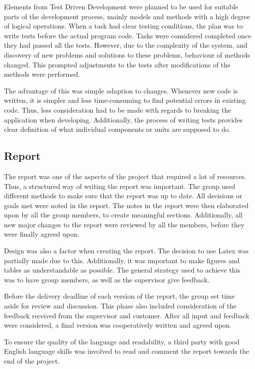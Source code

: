 Elements from Test Driven Development were planned to be used for suitable parts of the development process, mainly models and methods with a high degree of logical operations. When a task had clear testing conditions, the plan was to write tests before the actual program code. Tasks were considered completed once they had passed all the tests. However, due to the complexity of the system, and discovery of new problems and solutions to these problems, behaviour of methods changed. This prompted adjustments to the tests after modifications of the methods were performed.

The advantage of this was simple adaption to changes. Whenever new code is written, it is simpler and less time-consuming to find potential errors in existing code. Thus, less consideration had to be made with regards to breaking the application when developing. Additionally, the process of writing tests provides clear definition of what individual components or units are supposed to do.

\subsection{Report}
\label{subsec:process_and_methodology-process_methodology-report}

The report was one of the aspects of the project that required a lot of resources. Thus, a structured way of writing the report was important. The group used different methods to make sure that the report was up to date. All decisions or goals met were noted in the report. The notes in the report were then elaborated upon by all the group members, to create meaningful sections. Additionally, all new major changes to the report were reviewed by all the members, before they were finally agreed upon.

Design was also a factor when creating the report. The decision to use Latex was partially made due to this. Additionally, it was important to make figures and tables as understandable as possible. The general strategy used to achieve this was to have group members, as well as the supervisor give feedback.

Before the delivery deadline of each version of the report, the group set time aside for review and discussion. This phase also included consideration of the feedback received from the supervisor and customer. After all input and feedback were considered, a final version was cooperatively written and agreed upon.

To ensure the quality of the language and readability, a third party with good English language skills was involved to read and comment the report towards the end of the project.

